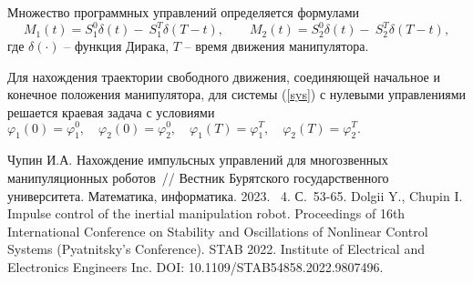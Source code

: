 Множество программных управлений определяется формулами
\begin{equation*}
		M_1(t)=S_1^0 \delta (t) - \: S_1^T \delta (T-t),\qquad 
		M_2(t)=S_2^0 \delta (t) -\: S_2^T \delta (T-t),
	\label{zv}
\end{equation*}
где $\delta(\cdot)$ -- функция Дирака, $T$ -- время движения манипулятора. 

Для нахождения траектории свободного движения, соединяющей начальное и конечное положения манипулятора, для системы (\ref{sys}) с нулевыми управлениями решается краевая задача с условиями
$
	\varphi_1(0)=\varphi_1^0, \quad \varphi_2(0)=\varphi_2^0, \quad \varphi_1(T)=\varphi_1^T, \quad \varphi_2(T)=\varphi_2^T. 
$

\begin{thebibliography}{99}
Чупин И.А. Нахождение импульсных управлений для многозвенных манипуляционных роботов~// Вестник Бурятского государственного университета. Математика, информатика. 2023. \textnumero~4. С.~53-65.
Dolgii Y., Chupin I. Impulse control of the inertial manipulation robot. Proceedings of 16th International Conference on Stability and Oscillations of Nonlinear Control Systems (Pyatnitsky’s Conference). STAB 2022. Institute of Electrical and Electronics Engineers Inc. DOI: 10.1109/STAB54858.2022.9807496.
\end{thebibliography}






%



